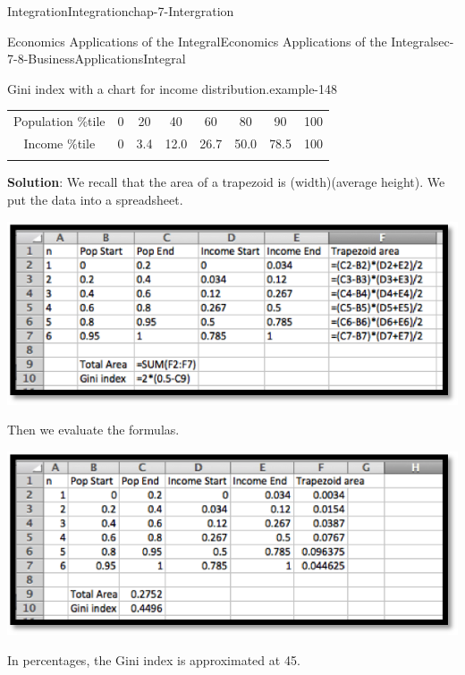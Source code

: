 \documentclass[oneside,10pt,]{book}
\newcommand{\terminology}[1]{\textbf{#1}}
\numberwithin{equation}{section}
\newcommand{\hrulethin}  {\noalign{\hrule height 0.04em}}
\newcommand{\hrulemedium}{\noalign{\hrule height 0.07em}}
\begin{document}
\begin{chapterptx}{Integration}{}{Integration}{}{}{chap-7-Intergration}
\begin{sectionptx}{Economics Applications of the Integral}{}{Economics Applications of the Integral}{}{}{sec-7-8-BusinessApplicationsIntegral}
\begin{example}{Gini index with a chart for income distribution.}{example-148}
\begin{sidebyside}{1}{0}{0}{0}
\begin{sbspanel}{1}
{\begin{tabular}{cccccccc}
Population \%tile&0&20&40&60&80&90&100\tabularnewline\hrulethin
Income \%tile&0&3.4&12.0&26.7&50.0&78.5&100\tabularnewline\hrulemedium
\end{tabular}
\par}
\end{sbspanel}%
\end{sidebyside}%
\par
\hypertarget{p-3122}{}%
\terminology{Solution}:  We recall that the area of a trapezoid is (width)(average height).  We put the data into a spreadsheet.%
\begin{sidebyside}{1}{0.2}{0.2}{0}%
\begin{sbspanel}{0.6}%
\includegraphics[width=1\linewidth]{images/sec7-8-16.png}
\end{sbspanel}%
\end{sidebyside}%
\par
\hypertarget{p-3123}{}%
Then we evaluate the formulas.%
\begin{sidebyside}{1}{0.2}{0.2}{0}%
\begin{sbspanel}{0.6}%
\includegraphics[width=1\linewidth]{images/sec7-8-17.png}
\end{sbspanel}%
\end{sidebyside}%
\par
\hypertarget{p-3124}{}%
In percentages, the Gini index is approximated at 45.%
\end{example}
%
%
\typeout{************************************************}

\end{sectionptx}
\end{chapterptx}
\end{document}
